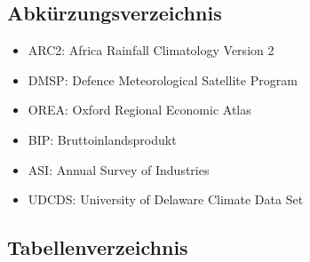 
\renewcommand*\figurename{Abbildung}
\renewcommand*\tablename{Tabelle}

\newpage

\renewcommand*\contentsname{Inhaltsverzeichnis}
{
\hypersetup{linkcolor=}
\setcounter{tocdepth}{3}
\tableofcontents
}

\vspace*{3cm}
\hypertarget{abkuxfcrzungen}{%
\subsection*{Abkürzungsverzeichnis}\label{abkuxfcrzungen}}

\begin{itemize}
\tightlist
\item
  ARC2: Africa Rainfall Climatology Version 2
\item
  DMSP: Defence Meteorological Satellite Program
\item
  OREA: Oxford Regional Economic Atlas
\item
  BIP: Bruttoinlandsprodukt
\item
  ASI: Annual Survey of Industries
\item
  UDCDS: University of Delaware Climate Data Set
\end{itemize}

\newpage

\hypertarget{lot}{%
\subsection*{Tabellenverzeichnis}\label{lot}}

